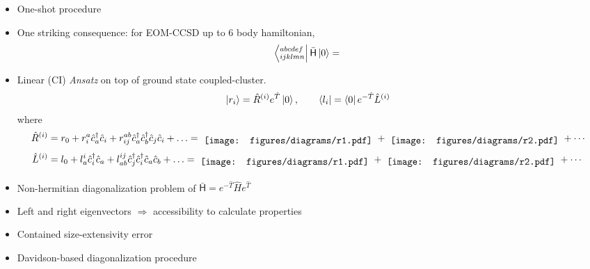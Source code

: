 \begin{itemize}
  \item
    One-shot procedure
  \item
    One striking consequence: for EOM-CCSD up to 6 body hamiltonian,
  $$
    \bra{^{abcdef}_{ijklmn}} \bar{\mathsf{H}} \ket{0}
    =
    \begin{tikzpicture}[baseline, line width=2, scale=5]
      
    \end{tikzpicture}
  $$

  \item
    Linear (CI) \textit{Ansatz} on top of ground state coupled-cluster.
    \begin{align*}
      \left| r_i \right> = \hat{R} ^{(i)} e^{\hat{T}} \left| 0 \right>, \qquad
      \left< l_i \right| = \left< 0 \right| e^{-\hat{T}} \hat{L}^{(i)}
    \end{align*}
    where
      \begin{align*}
        \hat{R} ^{(i)} &= r _{0}
         + r ^{a} _{i} \hat{c} ^{\dagger} _{a} \hat{c} _{i}
         + r ^{ab} _{ij} \hat{c} ^{\dagger} _{a} \hat{c} ^{\dagger} _{b}
                \hat{c} _{j} \hat{c} _{i}
         + \ldots
        =
        \tikz[baseline]\node{\texttt{[image: figures/diagrams/r1.pdf]}};
        +
        \tikz[baseline]\node{\texttt{[image: figures/diagrams/r2.pdf]}};
        +
        \cdots
        \\
        \hat{L} ^{(i)} &= l _{0}
                       + l ^{i} _{a} \hat{c} _{i}^{\dagger} \hat{c} _{a}
                       + l ^{ij} _{ab}
                          \hat{c} _{j} ^{\dagger} \hat{c} _{i}^{\dagger}
                          \hat{c} _{a} \hat{c} _{b}
                       + \ldots
        =
        \tikz[baseline]\node{\texttt{[image: figures/diagrams/r1.pdf]}};
        +
        \tikz[baseline]\node{\texttt{[image: figures/diagrams/r2.pdf]}};
        +
        \cdots
      \end{align*}

  \item
    Non-hermitian diagonalization problem of
      $ \bar{\mathsf{H}} = e^{-\hat{T}} \hat{H} e^{\hat{T}}$

  \item
    Left and right eigenvectors $ \Rightarrow $ accessibility to calculate
    properties

  \item
    Contained size-extensivity error

  \item
    Davidson-based diagonalization procedure

\end{itemize}

